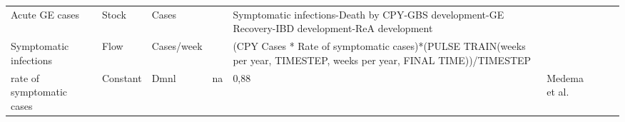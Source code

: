 \begin{landscape}
\begin{longtable}[c]{m{10em}lllm{15em}lll}
Acute GE cases                                & Stock    & Cases                    &                           & Symptomatic infections-Death by CPY-GBS development-GE Recovery-IBD development-ReA development                                                                                                                                                                                          &                                                                                                                                                                                              &                                                                                                                                                                                                                                       \\
Symptomatic infections                        & Flow     & Cases/week               &                           & (CPY Cases * Rate of symptomatic cases)*(PULSE TRAIN(weeks per year, TIMESTEP, weeks per year, FINAL TIME))/TIMESTEP                                                                                                                                                                     &                                                                                                                                                                                              &                                                                                                                                                                                                                                       \\
rate of symptomatic cases                     & Constant & Dmnl                     & na                        & 0,88                                                                                                                                                                                                                                                                                     & Medema et al.                                                                                                                                                                                &                                                                                                                                                                                                                                       \\

\end{longtable}
\end{landscape}
